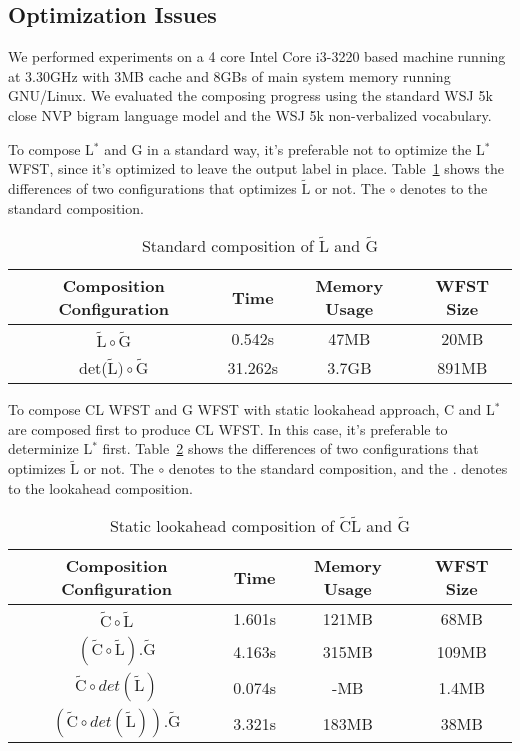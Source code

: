 \subsection{Optimization Issues}
\label{lexopt}

We performed experiments on a 4 core Intel Core i3-3220 based machine running at 3.30GHz with 3MB cache and 8GBs of main system memory running GNU/Linux. We evaluated the composing progress using the standard WSJ 5k close NVP bigram language model and the WSJ 5k non-verbalized vocabulary.

To compose L$^{*}$ and G in a standard way, it's preferable not to optimize the L$^{*}$ WFST, since it's optimized to leave the output label in place. Table~\ref{tbl:stdLG} shows the differences of two configurations that optimizes $\tilde{\text{L}}$ or not. The $\circ$ denotes to the standard composition.

\begin{table}[H]
\begin{center}
  \begin{tabular}{| c | c | c | c |}
  \hline
  Composition Configuration & Time & Memory Usage & WFST Size \\ \hline
  $\tilde{\text{L}}\circ\tilde{\text{G}}$ & 0.542s & 47MB & 20MB \\ \hline
  det($\tilde{\text{L}})\circ\tilde{\text{G}}$ & 31.262s & 3.7GB & 891MB \\ \hline
  \end{tabular}
  \caption{Standard composition of $\tilde{\text{L}}$ and $\tilde{\text{G}}$}
  \label{tbl:stdLG}
\end{center}
\end{table}

To compose CL WFST and G WFST with static lookahead approach, C and L$^{*}$ are composed first to produce CL WFST. In this case, it's preferable to determinize L$^{*}$ first. Table~\ref{tbl:lkhCLG} shows the differences of two configurations that optimizes $\tilde{\text{L}}$ or not. The $\circ$ denotes to the standard composition, and the $.$ denotes to the lookahead composition.

\begin{table}[H]
\begin{center}
  \begin{tabular}{| c | c | c | c |}
  \hline
  Composition Configuration & Time & Memory Usage & WFST Size  \\ \hline
  $\tilde{\text{C}}\circ\tilde{\text{L}}$ & 1.601s & 121MB & 68MB \\ \hline
  $(\tilde{\text{C}}\circ\tilde{\text{L}}).\tilde{\text{G}}$ & 4.163s & 315MB & 109MB \\ \hline
  $\tilde{\text{C}}\circ{}det(\tilde{\text{L}})$ & 0.074s & -MB & 1.4MB \\ \hline
  $(\tilde{\text{C}}\circ{}det(\tilde{\text{L}})).\tilde{\text{G}}$ & 3.321s & 183MB & 38MB \\ \hline
  \end{tabular}
  \caption{Static lookahead composition of $\tilde{\text{C}}\tilde{\text{L}}$ and $\tilde{\text{G}}$}
  \label{tbl:lkhCLG}
\end{center}
\end{table}